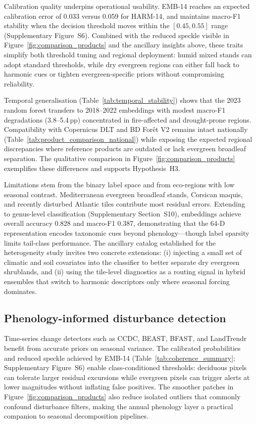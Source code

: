 \documentclass[utf8]{FrontiersinHarvard}
\begin{document}
Calibration quality underpins operational usability. EMB-14 reaches an expected calibration error of 0.033 versus 0.059 for HARM-14, and maintains macro-F1 stability when the decision threshold moves within the \([0.45,0.55]\) range (Supplementary Figure~S6). Combined with the reduced speckle visible in Figure~\ref{fig:comparison_products} and the ancillary insights above, these traits simplify both threshold tuning and regional deployment: humid mixed stands can adopt standard thresholds, while dry evergreen regions can either fall back to harmonic cues or tighten evergreen-specific priors without compromising reliability.

Temporal generalisation (Table~\ref{tab:temporal_stability}) shows that the 2023 random forest transfers to 2018--2022 embeddings with modest macro-F1 degradations (3.8--5.4\,pp) concentrated in fire-affected and drought-prone regions. Compatibility with Copernicus DLT and BD Forêt V2 remains intact nationally (Table~\ref{tab:product_comparison_national}) while exposing the expected regional discrepancies where reference products are outdated or lack evergreen broadleaf separation. The qualitative comparison in Figure~\ref{fig:comparison_products} exemplifies these differences and supports Hypothesis~H3.

Limitations stem from the binary label space and from eco-regions with low seasonal contrast. Mediterranean evergreen broadleaf stands, Corsican maquis, and recently disturbed Atlantic tiles contribute most residual errors. Extending to genus-level classification (Supplementary Section~S10), embeddings achieve overall accuracy 0.828 and macro-F1 0.387, demonstrating that the 64-D representation encodes taxonomic cues beyond phenology—though label sparsity limits tail-class performance. The ancillary catalog established for the heterogeneity study invites two concrete extensions: (i) injecting a small set of climatic and soil covariates into the classifier to better separate dry evergreen shrublands, and (ii) using the tile-level diagnostics as a routing signal in hybrid ensembles that switch to harmonic descriptors only where seasonal forcing dominates.

\subsection{Phenology-informed disturbance detection}
Time-series change detectors such as CCDC, BEAST, BFAST, and LandTrendr \citep{Zhu2014,Zhao2019,Verbesselt2010a,Verbesselt2010b,Kennedy2010,Kennedy2018} benefit from accurate priors on seasonal variance. The calibrated probabilities and reduced speckle achieved by EMB-14 (Table~\ref{tab:coherence_summary}; Supplementary Figure~S6) enable class-conditioned thresholds: deciduous pixels can tolerate larger residual excursions while evergreen pixels can trigger alerts at lower magnitudes without inflating false positives. The smoother patches in Figure~\ref{fig:comparison_products} also reduce isolated outliers that commonly confound disturbance filters, making the annual phenology layer a practical companion to seasonal decomposition pipelines.
\end{document}
